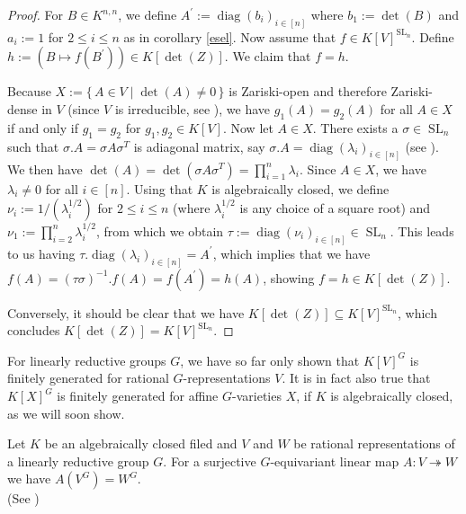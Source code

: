 \begin{proof}
  For $B \in K^{n,n}$, we define $A^\prime := \operatorname{diag}(b_i)_{i\in[n]}$ where $b_1 := \operatorname{det}(B)$ and $a_i := 1$ for $2\leq i\leq n$ as in corollary \ref{esel}.
  Now assume that $f \in K[V]^{\operatorname{SL}_n}$.
  Define $h := (B \mapsto f(B^\prime)) \in K[\operatorname{det}(Z)]$.
  We claim that $f = h$.
  
  Because $X := \{\, A \in V \mid \operatorname{det}(A) \neq 0 \,\}$ is Zariski-open and therefore Zariski-dense in $V$ (since $V$ is irreducible, see \cite[1.3.4, 1.3.5]{Gat17}), we have \linebreak$g_1(A) = g_2(A)$ for all $A \in X$ if and only if $g_1 = g_2$ for $g_1,g_2 \in K[V]$.
  Now let \linebreak$A \in X$.
  There exists a $\sigma \in \operatorname{SL}_n$ such that $\sigma .A = \sigma A \sigma^T$ is a\linebreak diagonal matrix, say $\sigma.A = \operatorname{diag}(\lambda_i)_{i\in[n]}$ (see \cite[p.~325]{Fis14}).
  We then have \linebreak$\operatorname{det}(A)= \operatorname{det}(\sigma A\sigma^T) = \prod_{i=1}^n \lambda_i$.
  Since $A \in X$, we have $\lambda_i \neq 0$ for all $i \in [n]$.
  \linebreak Using that $K$ is algebraically closed, we define $\nu_i := 1/(\lambda_i^{1/2})$ for $2\leq i\leq n$ (where $\lambda_i^{1/2}$ is any choice of a square root) and $\nu_1 := \prod_{i=2}^n \lambda_i^{1/2}$, from which we obtain $\tau := \operatorname{diag}(\nu_i)_{i\in[n]} \in \operatorname{SL}_n$.
  This leads to us having $\tau.\operatorname{diag}(\lambda_i)_{i\in[n]} = A^\prime$, which implies that we have $f(A) = (\tau\sigma)^{-1}.f(A)  = f(A^\prime) = h(A)$,  showing \linebreak$f = h \in K[\operatorname{det}(Z)]$.
  
  Conversely, it should be clear that we have $K[\operatorname{det}(Z)] \subseteq K[V]^{\operatorname{SL}_n}$, which concludes $K[\operatorname{det}(Z)] = K[V]^{\operatorname{SL}_n}$.
\end{proof}

For linearly reductive groups $G$, we have so far only shown that $K[V]^G$ is finitely generated for rational $G$-representations $V$.
It is in fact also true that $K[X]^G$ is finitely generated for affine $G$-varieties $X$, if $K$ is algebraically closed, as we will soon show.

\begin{lemma}\label{bloblo}
  Let $K$ be an algebraically closed filed and $V$ and $W$ be rational representations of a linearly reductive group $G$.
  For a surjective $G$-equivariant linear map $A \colon V \twoheadrightarrow W$ we have $A(V^G) = W^G$.  \\
  (See \cite[2.2.8]{DK15})
\end{lemma}

